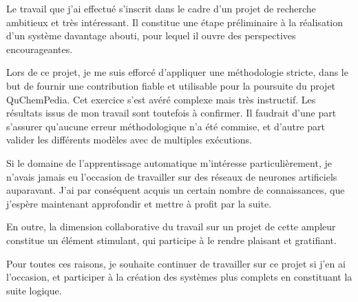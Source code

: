 
\par Le travail que j'ai effectué s'inscrit dans le cadre d'un projet de recherche ambitieux et très intéressant. Il constitue une étape préliminaire à la réalisation d'un système davantage abouti, pour lequel il ouvre des perspectives encourageantes.\\

\par Lors de ce projet, je me suis efforcé d'appliquer une méthodologie stricte, dans le but de fournir une contribution fiable et utilisable pour la poursuite du projet QuChemPedia. Cet exercice s'est avéré complexe mais très instructif. Les résultats issus de mon travail sont toutefois à confirmer. Il faudrait d'une part s'assurer qu'aucune erreur méthodologique n'a été commise, et d'autre part valider les différents modèles avec de multiples exécutions.\\

\par Si le domaine de l'apprentissage automatique m'intéresse particulièrement, je n'avais jamais eu l'occasion de travailler sur des réseaux de neurones artificiels auparavant. J'ai par conséquent acquis un certain nombre de connaissances, que j'espère maintenant approfondir et mettre à profit par la suite.

\par En outre, la dimension collaborative du travail sur un projet de cette ampleur constitue un élément stimulant, qui participe à le rendre plaisant et gratifiant.\\

\par Pour toutes ces raisons, je souhaite continuer de travailler sur ce projet si j'en ai l'occasion, et participer à la création des systèmes plus complets en constituant la suite logique.